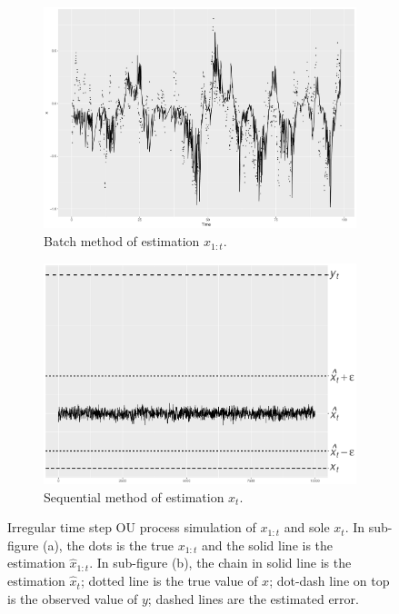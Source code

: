 \begin{figure}[h]
\centering
\begin{subfigure}[b]{0.45\textwidth}
    \includegraphics[width=\textwidth]{Chapters/05MCMCOU/plots/simudataOUallX.pdf}
     \caption{Batch method of estimation $x_{1:t}$.}
\end{subfigure}
\begin{subfigure}[b]{0.45\textwidth}
    \includegraphics[width=\textwidth]{Chapters/05MCMCOU/plots/simudataOUXt2.pdf}
     \caption{Sequential method of estimation $x_t$.}
\end{subfigure}
\caption{Irregular time step OU process simulation of $x_{1:t}$ and sole $x_t$. In sub-figure (a), the dots is the true $x_{1:t}$ and the solid line is the estimation $\hat{x}_{1:t}$. In sub-figure (b), the chain in solid line is the estimation $\hat{x}_t$; dotted line is the true value of $x$; dot-dash line on top is the observed value of $y$; dashed lines are the estimated error. }
\label{simuOUxt}
\end{figure}





